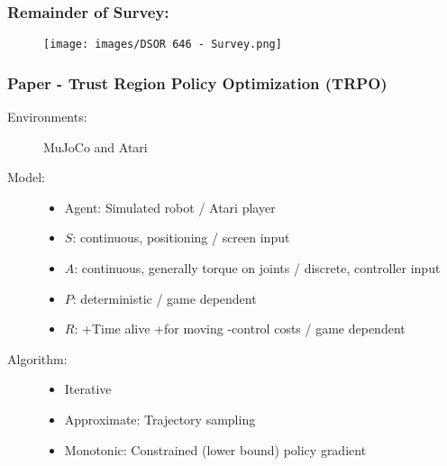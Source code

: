 \documentclass{beamer}
\begin{document}

\begin{frame}
    \frametitle{Remainder of Survey:}
    \begin{figure}\small
        \texttt{[image: images/DSOR 646 - Survey.png]}
    \end{figure}
\end{frame}

\begin{frame} %
    \frametitle{Paper \thepapercounter - Trust Region Policy Optimization (TRPO)%
    }
    \begin{description}
        \item[Environments:] MuJoCo and Atari
        \item[Model:]
        \begin{itemize}
            \item Agent: Simulated robot / Atari player
            \item $S$: continuous, positioning / screen input
            \item $A$: continuous, generally torque on joints / discrete, controller input
            \item $P$: deterministic / game dependent
            \item $R$: +Time alive +for moving -control costs / game dependent
        \end{itemize}
        \item[Algorithm:]
        \begin{itemize}
            \item Iterative
            \item Approximate: Trajectory sampling
            \item Monotonic: Constrained (lower bound) policy gradient
        \end{itemize}
    \end{description}
\end{frame}
\end{document}
